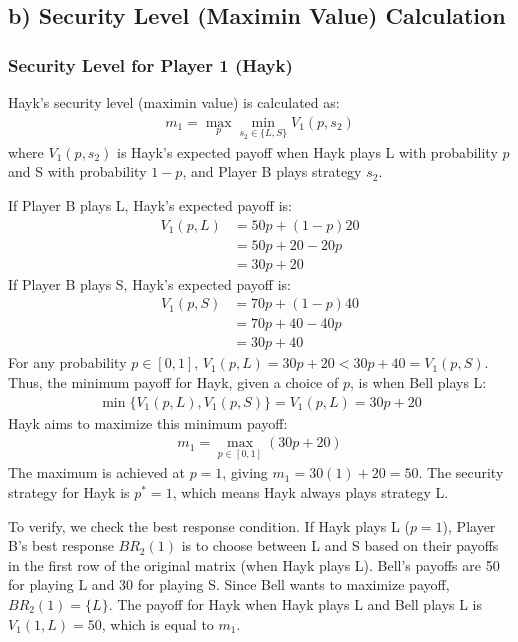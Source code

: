\documentclass{article}
\begin{document}
\subsection*{b) Security Level (Maximin Value) Calculation}

\subsubsection*{Security Level for Player 1 (Hayk)}
Hayk's security level (maximin value) is calculated as:
\begin{align*} m_1 = \max_p \min_{s_2 \in \{L, S\}} V_1(p, s_2) \end{align*}
where $V_1(p, s_2)$ is Hayk's expected payoff when Hayk plays L with probability $p$ and S with probability $1-p$, and Player B plays strategy $s_2$.

If Player B plays L, Hayk's expected payoff is:
\begin{align*} V_1(p, L) &= 50p + (1-p)20 \\ &= 50p + 20 - 20p \\ &= 30p + 20 \end{align*}
If Player B plays S, Hayk's expected payoff is:
\begin{align*} V_1(p, S) &= 70p + (1-p)40 \\ &= 70p + 40 - 40p \\ &= 30p + 40 \end{align*}
For any probability $p \in [0, 1]$, $V_1(p, L) = 30p + 20 < 30p + 40 = V_1(p, S)$. Thus, the minimum payoff for Hayk, given a choice of $p$, is when Bell plays L:
\begin{align*} \min \{ V_1(p, L), V_1(p, S) \} = V_1(p, L) = 30p + 20 \end{align*}
Hayk aims to maximize this minimum payoff:
\begin{align*} m_1 = \max_{p \in [0, 1]} (30p + 20) \end{align*}
The maximum is achieved at $p=1$, giving $m_1 = 30(1) + 20 = 50$.
The security strategy for Hayk is $p^*=1$, which means Hayk always plays strategy L.

To verify, we check the best response condition. If Hayk plays L ($p=1$), Player B's best response $BR_2(1)$ is to choose between L and S based on their payoffs in the first row of the original matrix (when Hayk plays L). Bell's payoffs are 50 for playing L and 30 for playing S. Since Bell wants to maximize payoff, $BR_2(1) = \{L\}$.
The payoff for Hayk when Hayk plays L and Bell plays L is $V_1(1, L) = 50$, which is equal to $m_1$.
\end{document}
